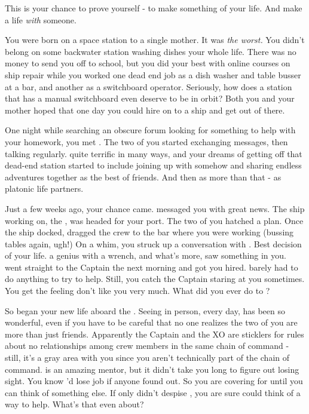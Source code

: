 \documentclass[char]{TMFHope}
\begin{document}
\name{\cBoy{}}

This is your chance to prove yourself - to make something of your life. And make a life \emph{with} someone.

You were born on a space station to a single mother. It was \emph{the worst.} You didn't belong on some backwater station washing dishes your whole life. There was no money to send you off to school, but you did your best with online courses on ship repair while you worked one dead end job as a dish washer and table busser at a bar, and another as a switchboard operator. Seriously, how does a station that has a manual switchboard even deserve to be in orbit? Both you and your mother hoped that one day you could hire on to a ship and get out of there. 

One night while searching an obscure forum looking for something to help with your homework, you met \cNav{}. The two of you started exchanging messages, then talking regularly. \cNav{\They} \cNav{\are} quite terrific in many ways, and your dreams of getting off that dead-end station started to include joining up with \cNav{} somehow and sharing endless adventures together as the best of friends. And then as more than that - as platonic life partners.

Just a few weeks ago, your chance came. \cNav{} messaged you with great news. The ship \cNav{\they} \cNav{\are} working on, the \pNew{}, was headed for your port. The two of you hatched a plan. Once the ship docked, \cNav{} dragged the crew to the bar where you were working (bussing tables again, ugh!) On a whim, you struck up a conversation with \cEng{}. Best decision of your life. \cEng{\They} \cEng{\are} a genius with a wrench, and what's more, \cEng{\they} saw something in you. \cEng{\They} went straight to the Captain the next morning and got you hired. \cNav{} barely had to do anything to try to help. Still, you catch the Captain staring at you sometimes. You get the feeling \cCap{\they} don't like you very much. What did you ever do to \cCap{\them}?

So began your new life aboard the \pNew{}. Seeing \cNav{} in person, every day, has been so wonderful, even if you have to be careful that no one realizes the two of you are more than just friends. Apparently the Captain and the XO are sticklers for rules about no relationships among crew members in the same chain of command - still, it's a gray area with you since you aren't technically part of the chain of command. \cEng{} is an amazing mentor, but it didn't take you long to figure out \cEng{\they} \cEng{\are} losing \cEng{\their} sight. You know \cEng{\they}'d lose \cEng{\their} job if anyone found out. So you are covering for \cEng{} until you can think of something else. If only \cEng{} didn't despise \cNav{}, you are sure \cNav{} could think of a way to help. What's that even about?
\end{document}
